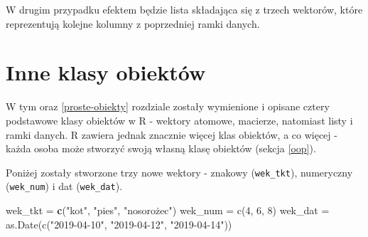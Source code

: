 \documentclass[paper=6in:9in,pagesize=pdftex,headinclude=on,footinclude=on,10pt]{scrbook}
\newenvironment{Shaded}{\begin{snugshade}}{\end{snugshade}}
\newcommand{\CommentTok}[1]{\textcolor[rgb]{0.56,0.35,0.01}{\textit{#1}}}
\newcommand{\DecValTok}[1]{\textcolor[rgb]{0.00,0.00,0.81}{#1}}
\newcommand{\KeywordTok}[1]{\textcolor[rgb]{0.13,0.29,0.53}{\textbf{#1}}}
\newcommand{\NormalTok}[1]{#1}
\newcommand{\StringTok}[1]{\textcolor[rgb]{0.31,0.60,0.02}{#1}}
\begin{document}
\begin{Shaded}
\end{Shaded}

W drugim przypadku efektem będzie lista składająca się z trzech wektorów, które reprezentują kolejne kolumny z poprzedniej ramki danych.

\begin{Shaded}
\end{Shaded}

\hypertarget{inne-klasy}{%
\section{Inne klasy obiektów}\label{inne-klasy}}

W tym oraz \ref{proste-obiekty} rozdziale zostały wymienione i opisane cztery podstawowe klasy obiektów w R - wektory atomowe, macierze, natomiast listy i ramki danych.
R zawiera jednak znacznie więcej klas obiektów, a co więcej - każda osoba może stworzyć swoją własną klasę obiektów (sekcja \ref{oop}).

Poniżej zostały stworzone trzy nowe wektory - znakowy (\texttt{wek\_tkt}), numeryczny (\texttt{wek\_num}) i dat (\texttt{wek\_dat}).

\begin{Shaded}
\begin{Highlighting}[]
\NormalTok{wek_tkt =}\StringTok{ }\KeywordTok{c}\NormalTok{(}\StringTok{"kot"}\NormalTok{, }\StringTok{"pies"}\NormalTok{, }\StringTok{"nosorożec")}
\StringTok{wek_num = c(4, 6, 8)}
\StringTok{wek_dat = as.Date(c("}\DecValTok{2019-04-10}\StringTok{", "}\DecValTok{2019-04-12}\StringTok{", "}\DecValTok{2019-04-14}\StringTok{"))}
\end{Highlighting}
\end{Shaded}
\end{document}
